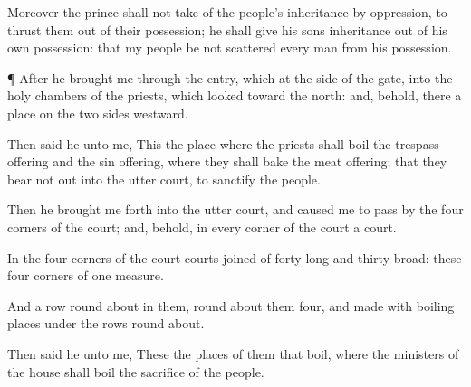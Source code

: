{Moreover the
prince shall not
take of the
people’s
inheritance by
oppression, to
thrust them out of their
possession;
{} he shall give his
sons
inheritance out of his own
possession: that my
people be not
scattered every
man from his
possession.


\par }{\PP {}¶ After he
brought me through the
entry, which
{} at the
side of the
gate, into the
holy
chambers of the
priests, which
looked toward the
north: and, behold, there
{} a
place on the two
sides
westward.

Then
said he unto me, This
{} the
place where the
priests shall
boil the trespass
offering and the sin
offering, where they shall
bake the meat
offering; that they
bear
{} not out into the
utter
court, to
sanctify the
people.

Then he brought me
forth into the
utter
court, and caused me to pass
by the
four
corners of the
court; and, behold, in
every
corner of the
court
{} a
court.

In the
four
corners of the
court
{}
courts
joined of
forty
{}
long and
thirty
broad: these
four
corners
{} of
one
measure.

And
{} a
row
{} round
about in them, round
about them
four, and
{}
made with boiling
places under the
rows round
about.

Then
said he unto me, These
{} the
places of them that
boil, where the
ministers of the
house shall
boil the
sacrifice of the
people.




\par }
